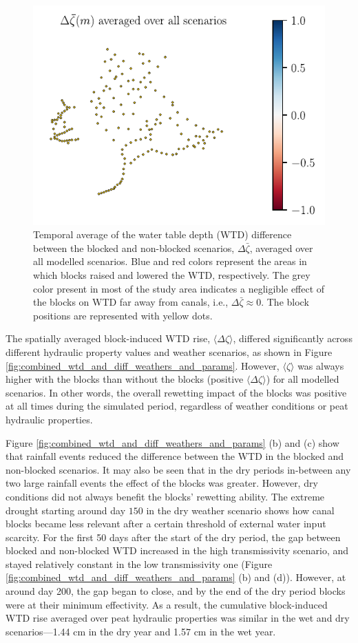 \documentclass[bg, manuscript]{copernicus}
\begin{document}
\begin{figure}[t]
\includegraphics[width=8.3 cm]{figs/diff_averaged_over_everything_with_blocks.pdf}
\caption{Temporal average of the water table depth (WTD) difference between the blocked and non-blocked scenarios, $\Delta \bar{\zeta}$, averaged over all modelled scenarios. Blue and red colors represent the areas in which blocks raised and lowered the WTD, respectively. The grey color present in most of the study area indicates a negligible effect of the blocks on WTD far away from canals, i.e., $\Delta \bar{\zeta} \approx 0$. The block positions are represented with yellow dots.}
\label{fig:diff_averaged_over_everything}
\end{figure}   


The spatially averaged block-induced WTD rise, $\langle \Delta \zeta \rangle$, differed significantly across different hydraulic property values and weather scenarios, as shown in Figure \ref{fig:combined_wtd_and_diff_weathers_and_params}.
However, $\langle \zeta \rangle$ was always higher with the blocks than without the blocks (positive $\langle \Delta \zeta \rangle$) for all modelled scenarios.
In other words, the overall rewetting impact of the blocks was positive at all times during the simulated period, regardless of weather conditions or peat hydraulic properties. 

Figure \ref{fig:combined_wtd_and_diff_weathers_and_params} (b) and (c) show that rainfall events reduced the difference between the WTD in the blocked and non-blocked scenarios.
It may also be seen that in the dry periods in-between any two large rainfall events the effect of the blocks was greater.
However, dry conditions did not always benefit the blocks' rewetting ability.
The extreme drought starting around day $150$ in the dry weather scenario shows how canal blocks became less relevant after a certain threshold of external water input scarcity.
For the first 50 days after the start of the dry period, the gap between blocked and non-blocked WTD increased in the high transmissivity scenario, and stayed relatively constant  in the low transmissivity one (Figure \ref{fig:combined_wtd_and_diff_weathers_and_params} (b) and (d)).
However, at around day 200, the gap began to close, and by the end of the dry period blocks were at their minimum effectivity.
As a result, the cumulative block-induced WTD rise averaged over peat hydraulic properties was similar in the wet and dry scenarios---1.44 \unit{cm} in the dry year and 1.57 \unit{cm} in the wet year.
\end{document}
